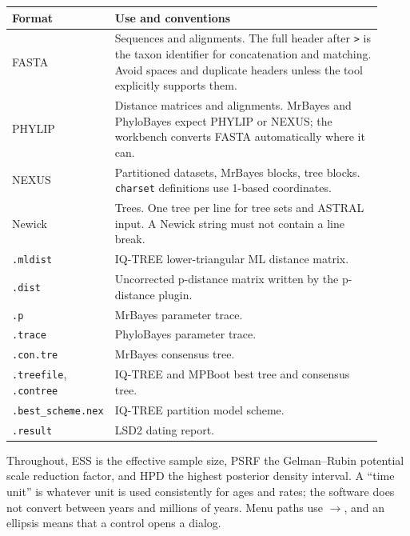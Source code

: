 \documentclass[10pt]{report}
\begin{document}
\begin{longtable}{@{}>{\raggedright\arraybackslash}p{0.20\linewidth}
                      >{\raggedright\arraybackslash}p{0.72\linewidth}@{}}
\toprule
Format & Use and conventions \\
\midrule
\endhead
FASTA & Sequences and alignments. The full header after \texttt{>} is the
taxon identifier for concatenation and matching. Avoid spaces and duplicate
headers unless the tool explicitly supports them. \\
PHYLIP & Distance matrices and alignments. MrBayes and PhyloBayes expect
PHYLIP or NEXUS; the workbench converts FASTA automatically where it can. \\
NEXUS & Partitioned datasets, MrBayes blocks, tree blocks. \texttt{charset}
definitions use 1-based coordinates. \\
Newick & Trees. One tree per line for tree sets and ASTRAL input. A Newick
string must not contain a line break. \\
\texttt{.mldist} & IQ-TREE lower-triangular ML distance matrix. \\
\texttt{.dist} & Uncorrected p-distance matrix written by the p-distance
plugin. \\
\texttt{.p} & MrBayes parameter trace. \\
\texttt{.trace} & PhyloBayes parameter trace. \\
\texttt{.con.tre} & MrBayes consensus tree. \\
\texttt{.treefile}, \texttt{.contree} & IQ-TREE and MPBoot best tree and
consensus tree. \\
\texttt{.best\_scheme.nex} & IQ-TREE partition model scheme. \\
\texttt{.result} & LSD2 dating report. \\
\bottomrule
\end{longtable}

Throughout, ESS is the effective sample size, PSRF the Gelman--Rubin
potential scale reduction factor, and HPD the highest posterior density
interval. A ``time unit'' is whatever unit is used consistently for ages and
rates; the software does not convert between years and millions of years.
Menu paths use $\rightarrow$, and an ellipsis means that a control opens a
dialog.

\printbibliography
\end{document}
